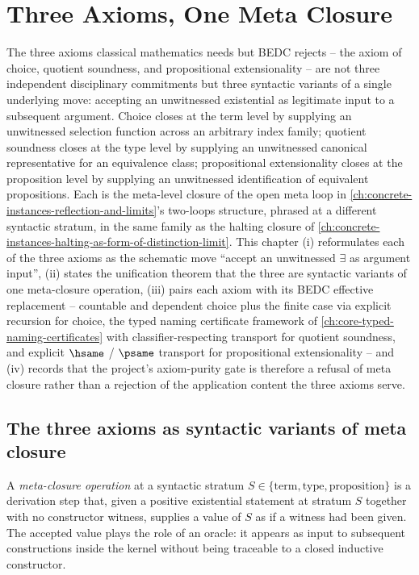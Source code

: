 \chapter{Three Axioms, One Meta Closure}
\label{ch:concrete-instances-three-axioms-one-closure}

The three axioms classical mathematics needs but BEDC rejects -- the axiom of choice, quotient soundness, and propositional extensionality -- are not three independent disciplinary commitments but three syntactic variants of a single underlying move: accepting an unwitnessed existential as legitimate input to a subsequent argument. Choice closes at the term level by supplying an unwitnessed selection function across an arbitrary index family; quotient soundness closes at the type level by supplying an unwitnessed canonical representative for an equivalence class; propositional extensionality closes at the proposition level by supplying an unwitnessed identification of equivalent propositions. Each is the meta-level closure of the open meta loop in \autoref{ch:concrete-instances-reflection-and-limits}'s two-loops structure, phrased at a different syntactic stratum, in the same family as the halting closure of \autoref{ch:concrete-instances-halting-as-form-of-distinction-limit}. This chapter (i) reformulates each of the three axioms as the schematic move ``accept an unwitnessed $\exists$ as argument input'', (ii) states the unification theorem that the three are syntactic variants of one meta-closure operation, (iii) pairs each axiom with its BEDC effective replacement -- countable and dependent choice plus the finite case via explicit recursion for choice, the typed naming certificate framework of \autoref{ch:core-typed-naming-certificates} with classifier-respecting transport for quotient soundness, and explicit $\hsame$ / $\psame$ transport for propositional extensionality -- and (iv) records that the project's axiom-purity gate is therefore a refusal of meta closure rather than a rejection of the application content the three axioms serve.

\section{The three axioms as syntactic variants of meta closure}
\label{sec:three-axioms-one-closure-variants}

\begin{definition}
\label{def:three-axioms-meta-closure-operation}
A \emph{meta-closure operation} at a syntactic stratum $S \in \{\text{term}, \text{type}, \text{proposition}\}$ is a derivation step that, given a positive existential statement at stratum $S$ together with no constructor witness, supplies a value of $S$ as if a witness had been given. The accepted value plays the role of an oracle: it appears as input to subsequent constructions inside the kernel without being traceable to a closed inductive constructor.
\end{definition}

